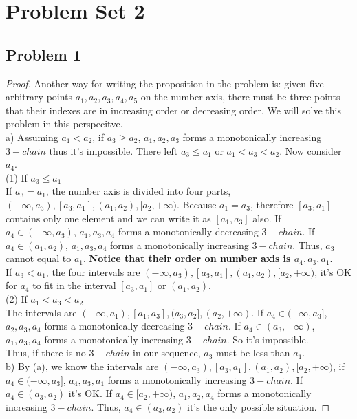 \documentclass{article}
\begin{document}
\section{Problem Set 2}
\subsection{Problem 1}
\begin{proof} Another way for writing the proposition in the problem is: given five arbitrary points $a_1,a_2,a_3,a_4,a_5$ on the number axis, there must be three points that their indexes are in increasing order or decreasing order. We will solve this problem in this perspecitve.
\\ a) Assuming $a_1 < a_2$, if $a_3 \geq a_2$, $a_1, a_2, a_3$ forms a monotonically increasing $3-chain$ thus it's impossible. There left $a_3 \leq a_1$ or $a_1 < a_3 < a_2$. Now consider $a_4$.
\\ (1) If $a_3 \leq a_1$
\\ If $a_3 = a_1$, the number axis is divided into four parts, $(-\infty, a_3), [a_3, a_1], (a_1, a_2), [a_2, +\infty)$. Because $a_1 = a_3$, therefore $[a_3, a_1]$ contains only one element and we can write it as $[a_1, a_3]$ also. If $a_4 \in (-\infty, a_3)$, $a_1, a_3, a_4$ forms a monotonically decreasing $3-chain$. If $a_4 \in (a_1, a_2)$, $a_1, a_3, a_4$ forms a monotonically increasing $3-chain$. Thus, $a_3$ cannot equal to $a_1$. \textbf{Notice that their order on number axis is $a_4, a_3, a_1$}.
\\ If $a_3 < a_1$, the four intervals are $(-\infty, a_3), [a_3, a_1], (a_1, a_2), [a_2, +\infty)$, it's OK for $a_4$ to fit in the interval $[a_3, a_1]$ or $(a_1, a_2)$.
\\ (2) If $a_1 < a_3 < a_2$
\\ The intervals are $(-\infty, a_1), [a_1, a_3], (a_3, a_2], (a_2, +\infty)$. If $a_4 \in (-\infty, a_3]$, $a_2, a_3, a_4$ forms a monotonically decreasing $3-chain$. If $a_4 \in (a_3, +\infty)$, $a_1, a_3, a_4$ forms a monotonically increasing $3-chain$. So it's impossible.
\\ Thus, if there is no $3-chain$ in our sequence, $a_3$ must be less than $a_1$.
\\ b) By (a), we know the intervals are $(-\infty, a_3), [a_3, a_1], (a_1, a_2), [a_2, +\infty)$, if $a_4 \in (-\infty, a_3]$, $a_4, a_3, a_1$ forms a monotonically increasing $3-chain$. If $a_4 \in (a_3, a_2)$ it's OK. If $a_4 \in [a_2, +\infty)$, $a_1, a_2, a_4$ forms a monotonically increasing $3-chain$. Thus, $a_4 \in (a_3, a_2)$ it's the only possible situation.

\end{proof}
\end{document}
